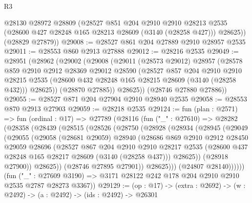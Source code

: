 \begin{lexlean}{R3}
\begin{coremodule}
        @28130
        @28972
        @28809
        (@28527
          @851
          @204
          @2910
          @2910
          @28213
          @2535
          (@28600 @427 @28248 @165 @28213 @28609 (@3140 (@28258 @427)))
          @28625))
      (@28829 @27879))
@29008 := @28527 @861 @204 @27889 @2910 @28957 @2535
@29011 := @28553 @860 @2913 @27888
@29012 := @28216 @2535
@29049 := @28951
    (@28962
      (@29002
        (@29008
          (@29011
            (@28573 @29012)
            @28957
            (@28578
              @859
              @2910
              @2912
              @28369
              @29012
              @28590
              (@28527
                @857
                @204
                @2910
                @2910
                @28215
                @2535
                (@28600 @432 @28248 @165 @28215 @28609 (@3140 (@28258 @432)))
                @28625))
            (@28870 @27885))
          @28625))
      (@28746 @27880 @27886))
@29055 := @28527 @871 @204 @27904 @2910 @28940 @2535
@29058 := @28553 @870 @2913 @27903
@29059 := @28218 @2535
@29124 := fun (plan : @2571) =>
  fun (ordinal : @17) =>
  @27789
    (@28116
      (fun ("_" : @27610) =>
      @28282
        (@28358
          (@28439
            (@28515
              (@28526
                (@28750
                  (@28928
                    (@28934
                      (@28945
                        (@29049
                          (@29055
                            (@29058
                              (@28681 @29059)
                              @28940
                              (@28686
                                @869
                                @2910
                                @2912
                                @28450
                                @29059
                                @28696
                                (@28527
                                  @867
                                  @204
                                  @2910
                                  @2910
                                  @28217
                                  @2535
                                  (@28600 @437 @28248 @165 @28217 @28609 (@3140 (@28258 @437)))
                                  @28625))
                              (@28918 @27900))
                            @28625))
                        (@28746 @27895 @27901))
                      @28625)))
                (@24807 @28140))))))
      (fun ("_" : @27609 @3190) =>
      @3171 @28122 @242 @178 @204 @2910 @2910 @2535 @2787 @28273 @3367))
@29129 := (op : @17) -> (extra : @2692) -> (w : @2492) -> (a : @2492) -> (ids : @2492) -> @26301

\end{coremodule}
\end{lexlean}
